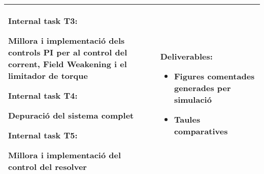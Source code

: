 \begin{center}
\begin{tabular}{| p{8.5cm} | p{5.25cm} |}
            \textbf{Internal task T3:}
                \newline \hspace*{0.3cm}
                \begin{minipage}[t]{8cm}
                    Millora i implementació dels controls PI per al control del
                    corrent, Field Weakening i el limitador de torque
                \end{minipage}
                \smallskip

            \textbf{Internal task T4:} 
                \newline \hspace*{0.3cm}
                \begin{minipage}[t]{8cm}
                    Depuració del sistema complet
                \end{minipage}
                \smallskip

            \textbf{Internal task T5:}
                \newline \hspace*{0.3cm}
                \begin{minipage}[t]{8cm}
                    Millora i implementació del control del resolver
                \end{minipage}
                \smallskip
            &
            \textbf{ Deliverables: }
                \begin{itemize}
                    \item { Figures comentades generades per simulació }
                    \item { Taules comparatives }
                \end{itemize} \\
        \hline
    \end{tabular}
\end{center}



